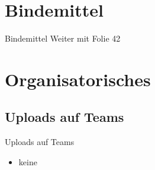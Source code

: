 \section{Bindemittel}
\BlueSectionSlide
\begin{frame}{Bindemittel}
    Weiter mit Folie 42
\end{frame}


\section{Organisatorisches}
\BlueSectionSlide

\subsection{Uploads auf Teams}
\begin{frame}{Uploads auf Teams}
	\begin{itemize}
		\item[\textbullet] keine
	\end{itemize}
	        
\end{frame}

        

\folieFragen


